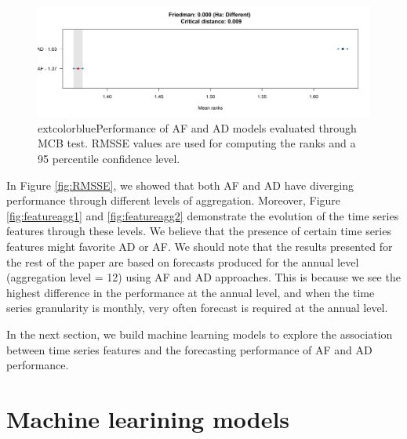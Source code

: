 \documentclass[preprint, 3p,
authoryear]{elsarticle} %
\begin{document}
\begin{figure}[H]

{\centering \includegraphics[width=1\linewidth]{img/300dpi/Fig_MCB} 

}

\caption{   extcolor{blue}{Performance of AF and AD models evaluated through MCB test. RMSSE values are used for computing the ranks and a 95 percentile confidence level.}}\label{fig:MCB}
\end{figure}

In Figure \ref{fig:RMSSE}, we showed that both AF and AD have diverging
performance through different levels of aggregation. Moreover, Figure
\ref{fig:featureagg1} and \ref{fig:featureagg2} demonstrate the
evolution of the time series features through these levels. We believe
that the presence of certain time series features might favorite AD or
AF. We should note that the results presented for the rest of the paper
are based on forecasts produced for the annual level (aggregation level
= 12) using AF and AD approaches. This is because we see the highest
difference in the performance at the annual level, and when the time
series granularity is monthly, very often forecast is required at the
annual level.

In the next section, we build machine learning models to explore the
association between time series features and the forecasting performance
of AF and AD performance.

\hypertarget{ml}{%
\section{Machine learining models}\label{ml}}
\end{document}
